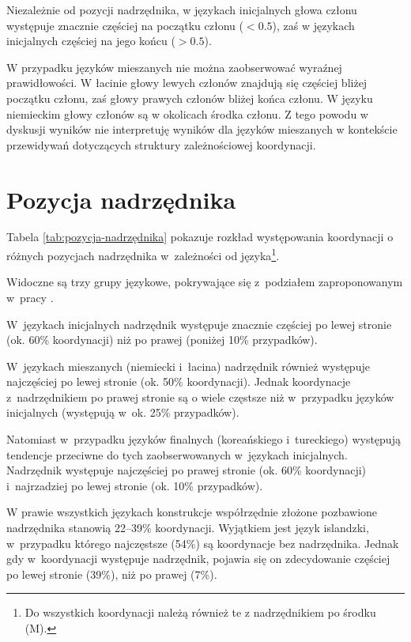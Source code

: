 Niezależnie od pozycji nadrzędnika, w językach inicjalnych głowa członu występuje znacznie częściej na początku członu ($<0.5$), zaś w językach inicjalnych częściej na jego końcu ($>0.5$).

W przypadku języków mieszanych nie można zaobserwować wyraźnej prawidłowości. W łacinie głowy lewych członów znajdują się częściej bliżej początku członu, zaś głowy prawych członów bliżej końca członu. W języku niemieckim głowy członów są w okolicach środka członu. Z tego powodu w dyskusji wyników nie interpretuję wyników dla języków mieszanych w kontekście przewidywań dotyczących struktury zależnościowej koordynacji.

\section{Pozycja nadrzędnika}

Tabela \ref{tab:pozycja-nadrzędnika} pokazuje rozkład występowania koordynacji o różnych pozycjach nadrzędnika w~zależności od języka\footnote{
Do wszystkich koordynacji należą również te z nadrzędnikiem po środku (M).}.



Widoczne są trzy grupy językowe, pokrywające się z~podziałem zaproponowanym w~pracy \cite{polinsky2012headedness}.

W~językach inicjalnych nadrzędnik występuje znacznie częściej po lewej stronie (ok. 60\% koordynacji) niż po prawej (poniżej 10\% przypadków).

W~językach mieszanych (niemiecki i~łacina) nadrzędnik również występuje najczęściej po lewej stronie (ok. 50\% koordynacji). Jednak koordynacje z~nadrzędnikiem po prawej stronie są o wiele częstsze niż w~przypadku języków inicjalnych (występują w~ok. 25\% przypadków).

Natomiast w~przypadku języków finalnych (koreańskiego i~tureckiego) występują tendencje przeciwne do tych zaobserwowanych w~językach inicjalnych. Nadrzędnik występuje najczęściej po prawej stronie (ok. 60\% koordynacji) i~najrzadziej po lewej stronie (ok. 10\% przypadków). 

W prawie wszystkich językach konstrukcje współrzędnie złożone pozbawione nadrzędnika stanowią 22--39\% koordynacji.  Wyjątkiem jest język islandzki, w~przypadku którego najczęstsze (54\%) są koordynacje bez nadrzędnika. Jednak gdy w~koordynacji występuje nadrzędnik, pojawia się on zdecydowanie częściej po lewej stronie (39\%), niż po prawej (7\%).

